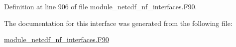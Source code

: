 Definition at line 906 of file module\+\_\+netcdf\+\_\+nf\+\_\+interfaces.\+F90.



The documentation for this interface was generated from the following file\+:\begin{DoxyCompactItemize}
\item 
\hyperlink{module__netcdf__nf__interfaces_8F90}{module\+\_\+netcdf\+\_\+nf\+\_\+interfaces.\+F90}\end{DoxyCompactItemize}
